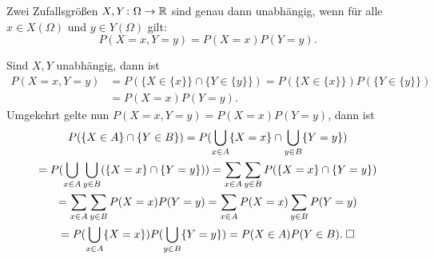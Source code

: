 \begin{Satz}
Zwei Zufallsgrößen $X,Y\colon\Omega\to\mathbb R$ sind genau dann unabhängig,
wenn für alle $x\in X(\Omega)$ und $y\in Y(\Omega)$ gilt:
\[P(X=x,Y=y)= P(X=x)P(Y=y).\]
\end{Satz}
 Sind $X,Y$ unabhängig, dann ist
\begin{align*}
P(X=x,Y=y) &= P(\{X\in\{x\}\}\cap\{Y\in\{y\}\})
= P(\{X\in\{x\}\})P(\{Y\in\{y\}\})\\
&= P(X=x)P(Y=y).
\end{align*}
Umgekehrt gelte nun $P(X=x,Y=y)=P(X=x)P(Y=y)$, dann ist
\begin{gather*}
P(\{X\in A\}\cap\{Y\in B\})
= P(\bigcup_{x\in A}\{X=x\}\cap\bigcup_{y\in B}\{Y=y\})\\
= P(\bigcup_{x\in A}\bigcup_{y\in B}(\{X=x\}\cap\{Y=y\}))
= \sum_{x\in A}\sum_{y\in B}P(\{X=x\}\cap\{Y=y\})\\
= \sum_{x\in A}\sum_{y\in B}P(X=x)P(Y=y)
= \sum_{x\in A}P(X=x)\sum_{y\in B}P(Y=y)\\
= P(\bigcup_{x\in A}\{X=x\})P(\bigcup_{y\in B}\{Y=y\})
= P(X\in A)P(Y\in B).\;\square
\end{gather*}


